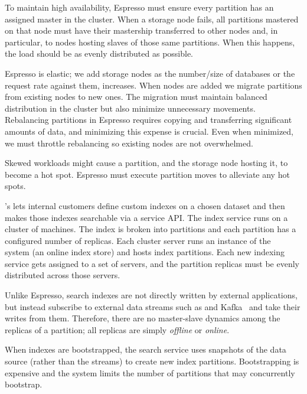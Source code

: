 To maintain high availability, Espresso must ensure every partition has an assigned master in the cluster. 
When a storage node fails, all partitions mastered on that node must have their mastership transferred to other
nodes and, in particular, to nodes hosting slaves of those same partitions. 
When this happens, the load should be as evenly distributed as possible.

Espresso is elastic; we add storage nodes as the number/size of databases
or the request rate against them, increases.
When nodes are added we migrate partitions from existing nodes to new ones.
The migration must maintain balanced distribution in the cluster but also minimize unnecessary movements. 
Rebalancing partitions in Espresso requires copying and transferring significant
amounts of data, and minimizing this expense is crucial.  Even when minimized, we must throttle rebalancing so 
existing nodes are not overwhelmed.

Skewed workloads might cause a partition, and the storage
node hosting it, to become a hot spot.  Espresso must execute partition moves to
alleviate any hot spots.

\subheader{\seas}
\linkedin's \seas lets internal customers define custom indexes on a
chosen dataset and then makes those indexes searchable via a service API.
The index service runs on a cluster of machines.  The index is broken into partitions
and each partition has a configured number of replicas.  Each cluster server runs 
an instance of the \sensei~\cite{sensei} system (an online index store) 
and hosts index partitions. Each new indexing service gets assigned
to a set of servers, and the partition replicas must be evenly distributed
across those servers. 

Unlike Espresso, search indexes are not directly written by external
applications, but instead subscribe to external data streams such as 
\databus and Kafka~\cite{linkedin12} and take their writes from them.  Therefore, 
there are no master-slave dynamics among the replicas of a partition; all replicas
are simply \emph{offline} or \emph{online}.  

When indexes are bootstrapped, the search service uses snapshots of the data
source (rather than the streams) to create new index partitions.   Bootstrapping 
is expensive and the system limits the number of partitions that may
concurrently bootstrap.  

